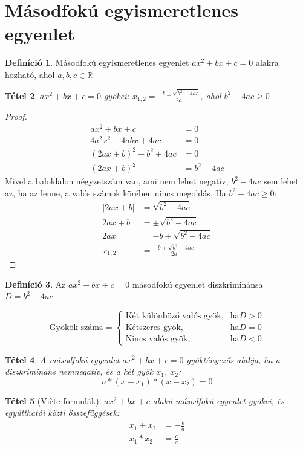 \documentclass[twoside,12pt]{report}
\newtheorem{theorem}{Tétel}[section]
\theoremstyle{definition}
\newtheorem{definition}[theorem]{Definíció}
\begin{document}
\section{Másodfokú egyismeretlenes egyenlet}
	\begin{definition}
		Másodfokú egyismeretlenes egyenlet $ax^2+bx+c=0$ alakra hozható, ahol $a,b,c\in\mathbb{R}$
	\end{definition}
	\begin{theorem}
		$ax^2+bx+c=0$ gyökei: $x_{1,2}=\frac{-b\pm\sqrt{b^2-4ac}}{2a}$, ahol $b^2-4ac\ge0$
	\end{theorem}
	\begin{proof}
		\begin{align*}
			ax^2+bx+c&=0\tag{$*4a$}\\
			4a^2x^2+4abx+4ac&=0\tag{Teljes négyzetté alakítás}\\
			(2ax+b)^2-b^2+4ac&=0\tag{$+b^2-4ac$}\\
			(2ax+b)^2&=b^2-4ac
		\end{align*}
		Mivel a baloldalon négyzetszám van, ami nem lehet negatív, $b^2-4ac$ sem lehet az, ha az lenne, a valós számok körében nincs megoldás. Ha $b^2-4ac\ge0$:
		\begin{align*}
			|2ax+b|&=\sqrt{b^2-4ac}\\
			2ax+b&=\pm\sqrt{b^2-4ac}\\
			2ax&=-b\pm\sqrt{b^2-4ac}\\
			x_{1,2}&=\frac{-b\pm\sqrt{b^2-4ac}}{2a}
		\end{align*}
	\end{proof}
	\begin{definition}
		Az $ax^2+bx+c=0$ másodfokú egyenlet diszkriminánsa $D=b^2-4ac$
	\end{definition}
	\begin{equation*}
	\text{Gyökök száma}=
	\begin{cases*}
		\text{Két különböző valós gyök}, & \text{ha} D>0\\
		\text{Kétszeres gyök}, &\text{ha} D=0\\
		\text{Nincs valós gyök},&\text{ha} D<0
	\end{cases*}
	\end{equation*}
	\begin{theorem}
		A másodfokú egyenlet $ax^2+bx+c=0$ gyöktényezős alakja, ha a diszkrimináns nemnegatív, és a két gyök $x_1$, $x_2$:
		\begin{equation*}
			a*(x-x_1)*(x-x_2)=0
		\end{equation*}
	\end{theorem}
	\begin{theorem}[Vi\`ete-formulák]
		$ax^2+bx+c$ alakú másodfokú egyenlet gyökei, és együtthatói közti összefüggések:
		\begin{align*}
			x_1+x_2&=-\frac{b}{a}\\
			x_1*x_2&=\frac{c}{a}
		\end{align*}
	\end{theorem}
\end{document}
